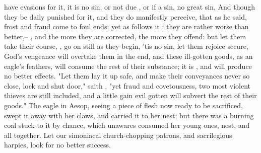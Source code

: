 have evasions for it, it is no sin, or not due , or if a sin,
no great sin, \etc{} And though they be daily punished for it, and they do
manifestly perceive, that as he said, frost and fraud come to foul ends; yet as
\Chrysostom{} follows it :
they are rather worse than better,-- ,
and the more they are corrected, the more they offend: but let them take their
course, , go on still as they begin,
'tis no sin, let them rejoice secure, God's vengeance will overtake them in the
end, and these ill-gotten goods, as an eagle's feathers,
will consume the rest of their substance; it is
, and will produce no better effects.
"Let them lay it up safe, and make their conveyances never
so close, lock and shut door," saith \Chrysostom{}, "yet fraud and covetousness,
two most violent thieves are still included, and a little gain evil gotten will
subvert the rest of their goods." The eagle in Aesop, seeing a piece of flesh
now ready to be sacrificed, swept it away with her claws, and carried it to her
nest; but there was a burning coal stuck to it by chance, which unawares
consumed her young ones, nest, and all together. Let our simoniacal
church-chopping patrons, and sacrilegious harpies, look for no better success.

